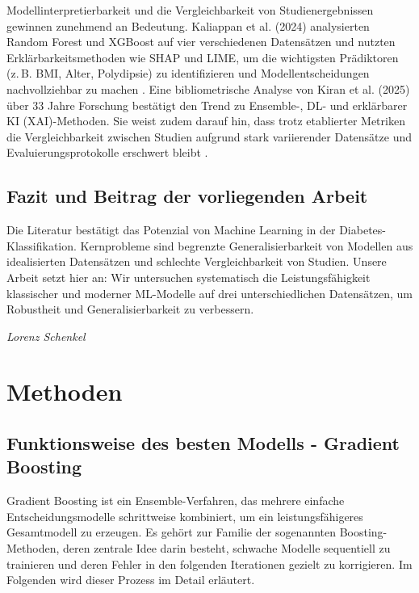 \documentclass[10pt]{scrartcl}
\begin{document}
Modellinterpretierbarkeit und die Vergleichbarkeit von Studienergebnissen gewinnen zunehmend an Bedeutung. Kaliappan et al. (2024) analysierten Random Forest und XGBoost auf vier verschiedenen Datensätzen und nutzten Erklärbarkeitsmethoden wie SHAP und LIME, um die wichtigsten Prädiktoren (z.\,B. BMI, Alter, Polydipsie) zu identifizieren und Modellentscheidungen nachvollziehbar zu machen \cite{Kaliappan2024}. Eine bibliometrische Analyse von Kiran et al. (2025) über 33 Jahre Forschung bestätigt den Trend zu Ensemble-, DL- und erklärbarer KI (XAI)-Methoden. Sie weist zudem darauf hin, dass trotz etablierter Metriken die Vergleichbarkeit zwischen Studien aufgrund stark variierender Datensätze und Evaluierungsprotokolle erschwert bleibt \cite{Kiran2025}.

\subsection{Fazit und Beitrag der vorliegenden Arbeit}
Die Literatur bestätigt das Potenzial von Machine Learning in der Diabetes-Klassifikation. Kernprobleme sind begrenzte Generalisierbarkeit von Modellen aus idealisierten Datensätzen und schlechte Vergleichbarkeit von Studien. Unsere Arbeit setzt hier an: Wir untersuchen systematisch die Leistungsfähigkeit klassischer und moderner ML-Modelle auf drei unterschiedlichen Datensätzen, um Robustheit und Generalisierbarkeit zu verbessern.

\begin{flushright}
  \footnotesize\textit{Lorenz Schenkel}
\end{flushright}





\section{Methoden}
\subsection{Funktionsweise des besten Modells - Gradient Boosting}

Gradient Boosting ist ein Ensemble-Verfahren, das mehrere einfache Entscheidungsmodelle schrittweise kombiniert, um ein leistungsfähigeres Gesamtmodell zu erzeugen. Es gehört zur Familie der sogenannten Boosting-Methoden, deren zentrale Idee darin besteht, schwache Modelle sequentiell zu trainieren und deren Fehler in den folgenden Iterationen gezielt zu korrigieren. Im Folgenden wird dieser Prozess im Detail erläutert.
\end{document}

